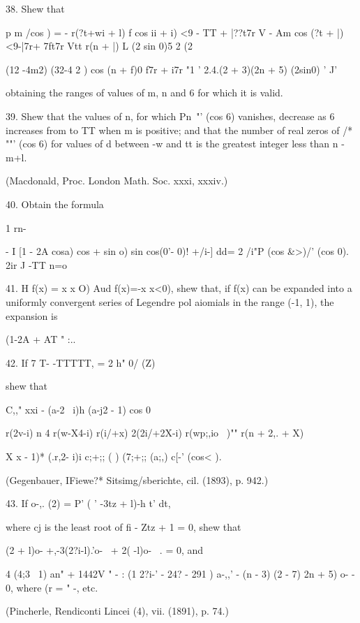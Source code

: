{{{{38. Shew that

p m /cos ) = - r(?t+wi + l) f cos ii + i) <9 - TT + |??t7r V - Am cos
(?t + |)<9-|7r+ 7ft7r Vtt r(n + |) L (2 sin 0)5 2 (2%

(12 -4m2) (32-4 2 ) cos (n + f)0 f7r + i7r "1 ' 2.4.(2 + 3)(2n + 5)
(2sin0) ' J'

obtaining the ranges of values of m, n and 6 for which it is valid.


39. Shew that the values of n, for which Pn~"' (cos 6) vanishes,
decrease as 6 increases from to TT when m is positive; and that the
number of real zeros of /* ""' (cos 6) for values of d between -w and
tt is the greatest integer less than n - m+l.

(Macdonald, Proc. London Math. Soc. xxxi, xxxiv.)

40. Obtain the formula

1 rn- \,

- I [1 - 2A cosa) cos + sin o) sin cos(0'- 0)! +/i-] dd= 2 /i"P (cos
\&>)/' (cos 0). 2ir J -TT n=o


41. H f(x) = x x O) Aud f(x)=-x x<0), shew that, if f(x) can be
expanded into a uniformly convergent series of Legendre pol aiomials
in the range (-1, 1), the expansion is

 (1-2A + AT " :..

42. If 7 T- -TTTTT, = 2 h" 0/ (Z)

shew that

C,," xxi - (a-2 \ i)h (a-j2 - 1) cos 0

  r(2v-i) n 4 r(w-X4-i) r(i/+x) 2(2i/+2X-i) r(wp;,io ~)"" r(n + 2,. +
X)

X x - 1)* (.r,2- i)i c;+;; ( ) (7;+;; (a;,) c[-' (cos< ).

(Gegenbauer, IFiewe?* Sitsimg/sberichte, cil. (1893), p. 942.)

43. If o-,. (2) = P' (  ' -3tz + l)-h t' dt,

where cj is the least root of fi - Ztz + 1 = 0, shew that

(2 + l)o- +,-3(2?i-l).'o- \, + 2( -l)o- \ . = 0, and

4 (4;3 \ 1) an" + 1442V " - : (1 2?i-' - 24? - 291 ) a-,,' - (n - 3)
(2 - 7) 2n + 5) o- - 0, where (r = " -, etc.

(Pincherle, Rendiconti Lincei (4), vii. (1891), p. 74.)

}}}}

